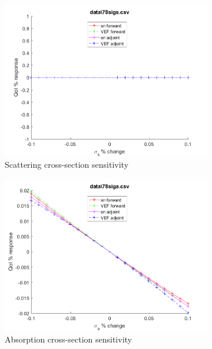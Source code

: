 \documentclass{article}
\begin{document}
\begin{figure}[H]
\begin{subfigure}{.5\textwidth}
  \includegraphics[width=.98\linewidth]{IanProposal/figures2/78sigsSens.png}
  \caption{Scattering cross-section sensitivity}
  \label{fig:sfig2}
\end{subfigure}%
\begin{subfigure}{.5\textwidth}
  \centering
  \includegraphics[width=.98\linewidth]{IanProposal/figures2/78sigaSens.png}
  \caption{Absorption cross-section sensitivity}
  \label{fig:sfig5}
\end{subfigure}%
\caption{}
\label{fig:fig}
\end{figure}
\newpage

\end{document}
